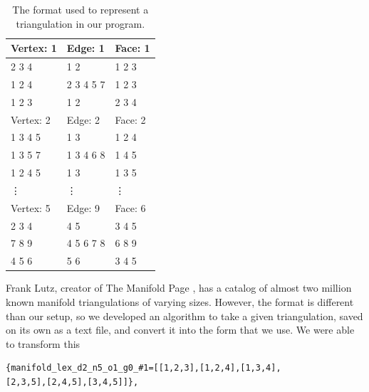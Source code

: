 \documentclass[12pt]{article}
\begin{document}
\begin{table}
\begin{center}
\begin{tabular}{|l|l|l|}
\hline
 Vertex: 1 &    Edge: 1 &    Face: 1 \\ \hline 

     2 3 4 &        1 2 &     1 2 3  \\

    1 2 4  & 2 3 4 5 7  &     1 2 3  \\

    1 2 3  &       1 2  &     2 3 4  \\ \hline 

 Vertex: 2 &    Edge: 2 &    Face: 2 \\ \hline

   1 3 4 5 &        1 3 &     1 2 4  \\

  1 3 5 7  & 1 3 4 6 8  &     1 4 5  \\

  1 2 4 5  &       1 3  &     1 3 5  \\ \hline 

 			\vdots & \vdots & \vdots \\ \hline 

 Vertex: 5 &    Edge: 9 &    Face: 6 \\ \hline

     2 3 4 &        4 5 &     3 4 5  \\

    7 8 9  & 4 5 6 7 8  &     6 8 9  \\

     4 5 6 &       5 6  &     3 4 5  \\
\hline
\end{tabular}
\end{center}
\caption{The format used to represent a triangulation in our program.}
\label{tab:format}
\end{table}

 Frank Lutz, creator of The Manifold Page \cite{lutzmanifold}, has a catalog of almost two million known manifold triangulations of varying sizes. However, the format is different than our setup, so we developed an algorithm to take a given triangulation, saved on its own as a text file, and convert it into the form that we use. We were able to transform this
  
\begin{verbatim}{manifold_lex_d2_n5_o1_g0_#1=[[1,2,3],[1,2,4],[1,3,4],
[2,3,5],[2,4,5],[3,4,5]]},
\end{verbatim}
 
\end{document}
